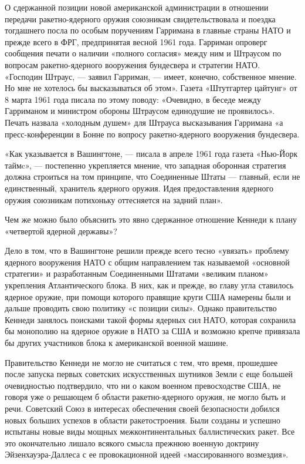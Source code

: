 \documentclass[12pt, a4paper, openany]{book}
\begin{document}
	О сдержанной позиции новой американской администрации в отношении передачи ракетно-ядерного оружия союзникам свидетельствовала и поездка тогдашнего посла по особым поручениям Гарримана в главные страны НАТО и прежде всего в ФРГ, предпринятая весной 1961 года. Гарриман опроверг сообщения печати о наличии «полного согласия» между ним и Штраусом по вопросам ракетно-ядерного вооружения бундесвера и стратегии НАТО. «Господин Штраус, — заявил Гарриман, — имеет, конечно, собственное мнение. Но мне не хотелось бы высказываться об этом». Газета «Штутгартер цайтунг» от 8 марта 1961 года писала по этому поводу: «Очевидно, в беседе между Гарриманом и министром обороны Штраусом единодушие не проявилось». Печать назвала «холодным душем» для Штрауса высказывания Гарримана «а пресс-конференции в Бонне по вопросу ракетно-ядерного вооружения бундесвера.
	
	«Как указывается в Вашингтоне, — писала в апреле 1961 года газета «Нью-Йорк таймc», — постепенно укрепляется мнение, что западная оборонная стратегия должна строиться на том принципе, что Соединенные Штаты — главный, если не единственный, хранитель ядерного оружия. Идея предоставления ядерного оружия союзникам потихоньку оттесняется на задний план».
	
	Чем же можно было объяснить это явно сдержанное отношение Кеннеди к плану «четвертой ядерной державы»?
	
	Дело в том, что в Вашингтоне решили прежде всего тесно «увязать» проблему ядерного вооружения НАТО с общим направлением так называемой «основной стратегии» и разработанным Соединенными Штатами «великим планом» укрепления Атлантического блока. В них, как и прежде, во главу угла ставилось ядерное оружие, при помощи которого правящие круги США намерены были и дальше проводить свою политику «с позиции силы». Однако правительство Кеннеди занялось поисками такой формы ядерных сил НАТО, которая сохранила бы монополию на ядерное оружие в НАТО за США и возможно крепче привязала бы других участников блока к американской военной машине.
	
	Правительство Кеннеди не могло не считаться с тем, что время, прошедшее после запуска первых советских искусственных шутников Земли с еще большей очевидностью подтвердило, что ни о каком военном превосходстве США, не говоря уже о решающем б области ракетно-ядерного оружия, не могло быть и речи. Советский Союз в интересах обеспечения своей безопасности добился новых больших успехов в области ракетостроения. Были созданы и успешно испытаны новые виды мощных межконтинентальных баллистических ракет. Все это окончательно лишало всякого смысла прежнюю военную доктрину Эйзенхауэра-Даллеса с ее провокационной идеей «массированного возмездия».
	
\end{document}
